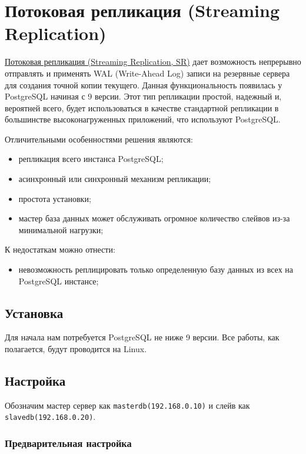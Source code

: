 \section{Потоковая репликация (Streaming Replication)}

\href{https://wiki.postgresql.org/wiki/Streaming_Replication}{Потоковая репликация (Streaming Replication, SR)} дает возможность непрерывно отправлять и применять WAL (Write-Ahead Log) записи на резервные сервера для создания точной копии текущего. Данная функциональность появилась у PostgreSQL начиная с 9 версии. Этот тип репликации простой, надежный и, вероятней всего, будет использоваться в качестве стандартной репликации в большинстве высоконагруженных приложений, что используют PostgreSQL.

Отличительными особенностями решения являются:

\begin{itemize}
  \item репликация всего инстанса PostgreSQL;
  \item асинхронный или синхронный механизм репликации;
  \item простота установки;
  \item мастер база данных может обслуживать огромное количество слейвов из-за минимальной нагрузки;
\end{itemize}

К недостаткам можно отнести:

\begin{itemize}
  \item невозможность реплицировать только определенную базу данных из всех на PostgreSQL инстансе;
\end{itemize}

\subsection{Установка}

Для начала нам потребуется PostgreSQL не ниже 9 версии. Все работы, как полагается, будут проводится на Linux.

\subsection{Настройка}

Обозначим мастер сервер как \lstinline!masterdb(192.168.0.10)! и слейв как \lstinline!slavedb(192.168.0.20)!.

\subsubsection{Предварительная настройка}

